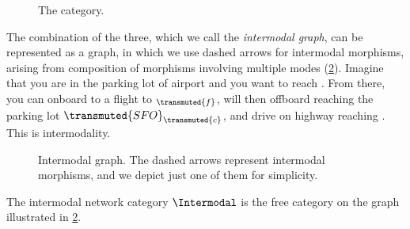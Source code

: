 \begin{example}
  \begin{figure}[h!]
    \begin{center}
    \end{center}
    \caption{The \Board category. }
    \label{fig:boarding}
  \end{figure}

  The combination of the three, which we call the \emph{intermodal graph}, can be represented as a graph, in which we use dashed arrows for intermodal morphisms, arising from composition of morphisms involving multiple modes (\cref{fig:intermodal}). Imagine that you are in the parking lot of  airport and you want to reach . From there, you can onboard to a  flight to $_\transmuted{f}$, will then offboard reaching the parking lot $\transmuted{SFO}_\transmuted{c}$, and drive on highway  reaching . This is intermodality.

  \begin{figure}[h!]
    \begin{center}
      {}
    \end{center}
    \caption{Intermodal graph. The dashed arrows represent intermodal morphisms, and we depict just one of them for simplicity.
    }
    \label{fig:intermodal}
  \end{figure}
\end{example}

The intermodal network category $\Intermodal$ is the free category on the graph illustrated in \cref{fig:intermodal}.

